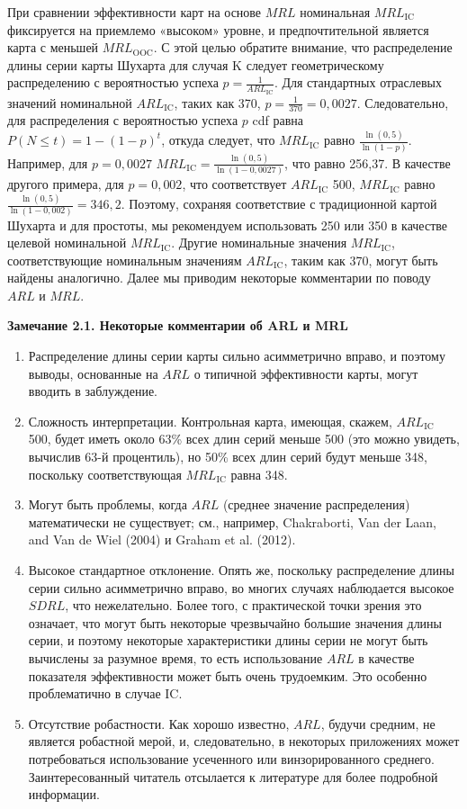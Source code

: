 При сравнении эффективности карт на основе \(MRL\) номинальная \(MRL_{\text{IC}}\) фиксируется на приемлемо «высоком» уровне, и предпочтительной является карта с меньшей \(MRL_{\text{OOC}}\). С этой целью обратите внимание, что распределение длины серии карты Шухарта для случая K следует геометрическому распределению с вероятностью успеха \(p = \frac{1}{ARL_{\text{IC}}}\). Для стандартных отраслевых значений номинальной \(ARL_{\text{IC}}\), таких как 370, \(p = \frac{1}{370} = 0,0027\). Следовательно, для распределения с вероятностью успеха \(p\) cdf равна \(P(N \leq t) = 1 - (1 - p)^t\), откуда следует, что \(MRL_{\text{IC}}\) равно \(\frac{\ln(0,5)}{\ln(1 - p)}\). Например, для \(p = 0,0027\) \(MRL_{\text{IC}} = \frac{\ln(0,5)}{\ln(1 - 0,0027)}\), что равно 256,37. В качестве другого примера, для \(p = 0,002\), что соответствует \(ARL_{\text{IC}}\) 500, \(MRL_{\text{IC}}\) равно \(\frac{\ln(0,5)}{\ln(1 - 0,002)} = 346,2\). Поэтому, сохраняя соответствие с традиционной картой Шухарта и для простоты, мы рекомендуем использовать 250 или 350 в качестве целевой номинальной \(MRL_{\text{IC}}\). Другие номинальные значения \(MRL_{\text{IC}}\), соответствующие номинальным значениям \(ARL_{\text{IC}}\), таким как 370, могут быть найдены аналогично. Далее мы приводим некоторые комментарии по поводу \(ARL\) и \(MRL\).

\noindent\textbf{Замечание 2.1. Некоторые комментарии об ARL и MRL}

\begin{enumerate}
	\item Распределение длины серии карты сильно асимметрично вправо, и поэтому выводы, основанные на \(ARL\) о типичной эффективности карты, могут вводить в заблуждение.
	\item Сложность интерпретации. Контрольная карта, имеющая, скажем, \(ARL_{\text{IC}}\) 500, будет иметь около 63\% всех длин серий меньше 500 (это можно увидеть, вычислив 63-й процентиль), но 50\% всех длин серий будут меньше 348, поскольку соответствующая \(MRL_{\text{IC}}\) равна 348.
	\item Могут быть проблемы, когда \(ARL\) (среднее значение распределения) математически не существует; см., например, Chakraborti, Van der Laan, and Van de Wiel (2004) и Graham et al. (2012).
	\item Высокое стандартное отклонение. Опять же, поскольку распределение длины серии сильно асимметрично вправо, во многих случаях наблюдается высокое \(SDRL\), что нежелательно. Более того, с практической точки зрения это означает, что могут быть некоторые чрезвычайно большие значения длины серии, и поэтому некоторые характеристики длины серии не могут быть вычислены за разумное время, то есть использование \(ARL\) в качестве показателя эффективности может быть очень трудоемким. Это особенно проблематично в случае IC.
	\item Отсутствие робастности. Как хорошо известно, \(ARL\), будучи средним, не является робастной мерой, и, следовательно, в некоторых приложениях может потребоваться использование усеченного или винзорированного среднего. Заинтересованный читатель отсылается к литературе для более подробной информации.
\end{enumerate}


